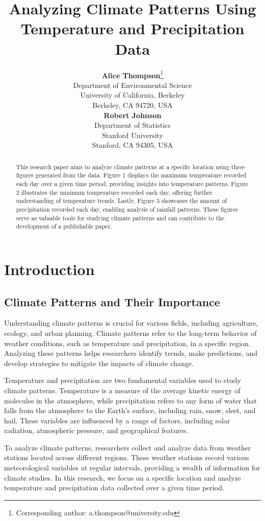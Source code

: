 \documentclass{article}
\title{Analyzing Climate Patterns Using Temperature and Precipitation Data}
\author{
  \textbf{Alice Thompson}\thanks{Corresponding author: a.thompson@university.edu} \\
  Department of Environmental Science\\
  University of California, Berkeley\\
  Berkeley, CA 94720, USA \\
  \And
  \textbf{Robert Johnson} \\
  Department of Statistics\\
  Stanford University\\
  Stanford, CA 94305, USA \\
}
\begin{document}
\maketitle

\begin{abstract}
This research paper aims to analyze climate patterns at a specific location using three figures generated from the data. Figure 1 displays the maximum temperature recorded each day over a given time period, providing insights into temperature patterns. Figure 2 illustrates the minimum temperature recorded each day, offering further understanding of temperature trends. Lastly, Figure 3 showcases the amount of precipitation recorded each day, enabling analysis of rainfall patterns. These figures serve as valuable tools for studying climate patterns and can contribute to the development of a publishable paper.
\end{abstract}

\section{Introduction}

\subsection{Climate Patterns and Their Importance}

Understanding climate patterns is crucial for various fields, including agriculture, ecology, and urban planning. Climate patterns refer to the long-term behavior of weather conditions, such as temperature and precipitation, in a specific region. Analyzing these patterns helps researchers identify trends, make predictions, and develop strategies to mitigate the impacts of climate change.

Temperature and precipitation are two fundamental variables used to study climate patterns. Temperature is a measure of the average kinetic energy of molecules in the atmosphere, while precipitation refers to any form of water that falls from the atmosphere to the Earth's surface, including rain, snow, sleet, and hail. These variables are influenced by a range of factors, including solar radiation, atmospheric pressure, and geographical features.

To analyze climate patterns, researchers collect and analyze data from weather stations located across different regions. These weather stations record various meteorological variables at regular intervals, providing a wealth of information for climate studies. In this research, we focus on a specific location and analyze temperature and precipitation data collected over a given time period.
\end{document}
